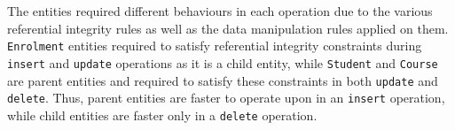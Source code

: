 The entities required different behaviours in each operation due to the various
referential integrity rules as well as  the data manipulation rules applied on
them.
\texttt{Enrolment} entities required to satisfy referential integrity
constraints during \texttt{insert} and \texttt{update} operations as it is a child entity,
while \texttt{Student} and \texttt{Course} are parent entities and required to
satisfy these constraints in both \texttt{update} and \texttt{delete}.   Thus,
parent entities are faster to operate upon in an \texttt{insert} operation,  
while child entities are faster only in a \texttt{delete} operation.
